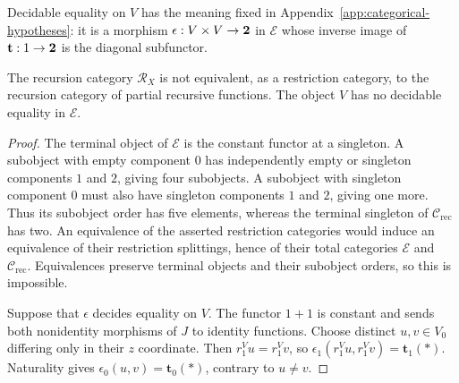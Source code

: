 Decidable equality on $V$ has the meaning fixed in
Appendix~\ref{app:categorical-hypotheses}: it is a morphism
$\epsilon:V\times V\to\mathbf 2$ in $\mathcal E$ whose inverse image
of $\mathbf t:1\to\mathbf 2$ is the diagonal subfunctor.

\begin{proposition}\label{prop:fork-distinction}
The recursion category $\mathscr R_X$ is not equivalent, as a
restriction category, to the recursion category of partial recursive functions.
The object $V$ has no decidable equality in $\mathcal E$.
\end{proposition}
\begin{proof}
The terminal object of $\mathcal E$ is the constant functor at a singleton.
A subobject with empty component $0$ has independently empty or
singleton components $1$ and $2$, giving four subobjects. A
subobject with singleton component $0$ must also have singleton
components $1$ and $2$, giving one more. Thus its subobject order has five elements, whereas
the terminal singleton of $\mathcal C_{\mathrm{rec}}$ has two.
An equivalence of the asserted restriction categories would induce
an equivalence of their restriction splittings, hence of their
total categories $\mathcal E$ and $\mathcal C_{\mathrm{rec}}$.
Equivalences preserve terminal objects and their subobject orders,
so this is impossible.

Suppose that $\epsilon$ decides equality on $V$. The functor $1+1$
is constant and sends both nonidentity morphisms of $J$ to
identity functions. Choose distinct $u,v\in V_0$ differing only
in their $z$ coordinate. Then $r_1^Vu=r_1^Vv$, so
$\epsilon_1(r_1^Vu,r_1^Vv)=\mathbf t_1(*)$.
Naturality gives $\epsilon_0(u,v)=\mathbf t_0(*)$, contrary to $u\ne v$.
\end{proof}


